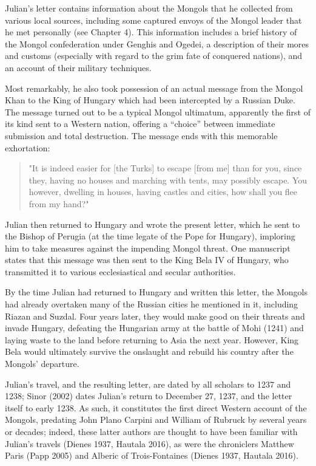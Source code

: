 Julian's letter contains information about the Mongols that he collected from various local sources, including some captured envoys of the Mongol leader that he met personally (see Chapter 4). This information includes a brief history of the Mongol confederation under Genghis and Ogedei, a description of their mores and customs (especially with regard to the grim fate of conquered nations), and an account of their military techniques.

Most remarkably, he also took possession of an actual message from the Mongol Khan to the King of Hungary which had been intercepted by a Russian Duke. The message turned out to be a typical Mongol ultimatum, apparently the first of its kind sent to a Western nation, offering a ``choice'' between immediate submission and total destruction. The message ends with this memorable exhortation:

\begin{quote}
"It is indeed easier for [the Turks] to escape [from me] than for you, since they, having no houses and marching with tents, may possibly escape. You however, dwelling in houses, having castles and cities, how shall you flee from my hand?"
\end{quote}

Julian then returned to Hungary and wrote the present letter, which he sent to the Bishop of Perugia (at the time legate of the Pope for Hungary), imploring him to take measures against the impending Mongol threat. One manuscript states that this message was then sent to the King Bela IV of Hungary, who transmitted it to various ecclesiastical and secular authorities. 

By the time Julian had returned to Hungary and written this letter, the Mongols had already overtaken many of the Russian cities he mentioned in it, including Riazan and Suzdal. Four years later, they would make good on their threats and invade Hungary, defeating the Hungarian army at the battle of Mohi (1241) and laying waste to the land before returning to Asia the next year. However, King Bela would ultimately survive the onslaught and rebuild his country after the Mongols' departure.

Julian's travel, and the resulting letter, are dated by all scholars to 1237 and 1238; Sinor (2002) dates Julian's return to December 27, 1237, and the letter itself to early 1238. As such, it constitutes the first direct Western account of the Mongols, predating John Plano Carpini and William of Rubruck by several years or decades; indeed, these latter authors are thought to have been familiar with Julian's travels (Dienes 1937, Hautala 2016), as were the chroniclers Matthew Paris (Papp 2005) and Alberic of Trois-Fontaines (Dienes 1937, Hautala 2016). 

